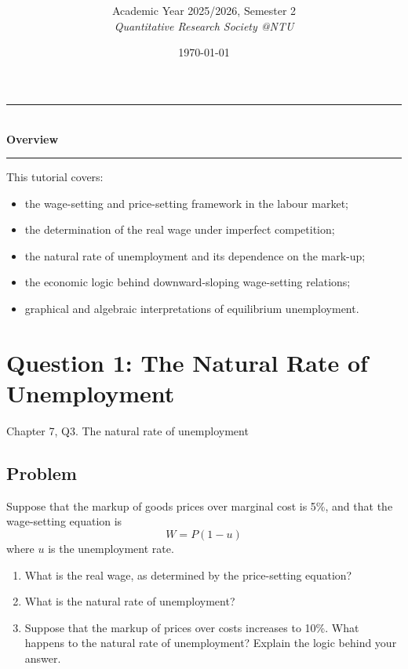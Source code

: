 \documentclass[12pt]{article}
\title{
\CourseCode \CourseName \\[0.3em]
\large \DocType
}
\author{
  Academic Year 2025/2026, Semester 2 \\[0.25em]
  \textit{Quantitative Research Society @NTU}
}
\date{\today}
\begin{document}
\maketitle
\thispagestyle{plainfirst}
\pagestyle{main}
\bigskip

\begin{center}
  \rule{0.8\textwidth}{0.4pt}\\[4pt]
  \textbf{Overview}\\[2pt]
  \rule{0.8\textwidth}{0.4pt}
\end{center}

\noindent
This tutorial covers:
\begin{itemize}[leftmargin=*]
  \item the wage-setting and price-setting framework in the labour market;
  \item the determination of the real wage under imperfect competition;
  \item the natural rate of unemployment and its dependence on the mark-up;
  \item the economic logic behind downward-sloping wage-setting relations;
  \item graphical and algebraic interpretations of equilibrium unemployment.
\end{itemize}

\bigskip

\newpage
\tableofcontents

\newpage
\section{Question 1: The Natural Rate of Unemployment}

\noindent
Chapter 7, Q3. The natural rate of unemployment

\subsection{Problem}
Suppose that the markup of goods prices over marginal cost is 5\%, and that the wage-setting equation is
\[
W = P(1-u)
\]
where \(u\) is the unemployment rate.
\begin{enumerate}[label=(\alph*)]
    \item What is the real wage, as determined by the price-setting equation?
    \item What is the natural rate of unemployment?
    \item Suppose that the markup of prices over costs increases to 10\%. What happens to the natural rate of unemployment? Explain the logic behind your answer.
\end{enumerate}
\end{document}
